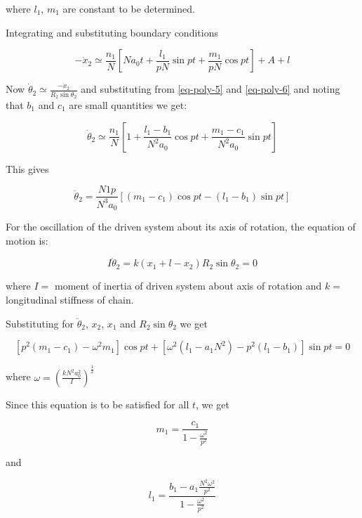 where $l_1$, $m_1$ are constant to be determined.

Integrating and substituting boundary conditions

\begin{equation}
  -\dot{x}_2 \simeq \frac{n_1}{N}\left[Na_0t+\frac{l_1}{pN}\sin pt +\frac{m_1}{pN} \cos pt\right] + A + l
\end{equation}

Now $\dot{\theta}_2 \simeq \frac{-\dot{x}_2}{R_2\sin\theta_2}$ and substituting from \ref{eq-poly-5} and \ref{eq-poly-6} and noting that $b_1$ and $c_1$ are small quantities we get:

\begin{equation}
  \dot{\theta}_2 \simeq \frac{n_1}{N}\left[ 1 + \frac{l_1-b_1}{N^2a_0}\cos pt + \frac{m_1-c_1}{N^2a_0} \sin pt \right]
\end{equation}

This gives

\begin{equation}
  \ddot{\theta}_2 = \frac{N1p}{N^3a_0}\left[(m_1-c_1)\cos pt - (l_1-b_1)\sin pt \right]
\end{equation}

For the oscillation of the driven system about its axis of rotation, the equation of motion is:

\begin{equation}
  I\ddot{\theta}_2 = k(x_1+l-x_2)R_2\sin\theta_2=0
\end{equation}

where $I=$ moment of inertia of driven system about axis of rotation and $k=$ longitudinal stiffness of chain.

Substituting for $\ddot{\theta}_2$, $x_2$, $x_1$ and $R_2\sin\theta_2$ we get

\begin{equation}
  \left[p^2(m_1-c_1)-\omega^2m_1 \right]\cos pt + \left[\omega^2(l_1-a_1N^2)-p^2(l_1-b_1) \right]\sin pt = 0
\end{equation}

where $\omega = \left(\frac{kN^2a_0^2}{I}\right)^\frac{1}{2}$

Since this equation is to be satisfied for all $t$, we get

\begin{equation}
  m_1 = \frac{c_1}{1-\frac{\omega^2}{p^2}}
\end{equation}

and

\begin{equation}
  l_1=\frac{b_1-a_1\frac{N^2\omega^2}{p^2}}{1-\frac{\omega^2}{p^2}}
\end{equation}

